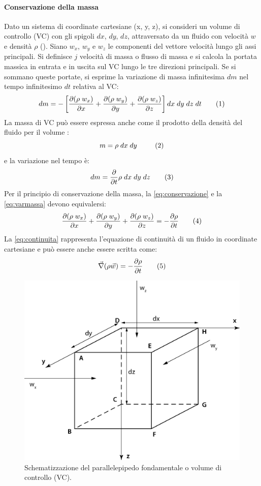 \paragraph{Conservazione della massa}
Dato un sistema di coordinate cartesiane (x, y, z), si consideri un volume di controllo (VC) con gli spigoli \(dx\), \(dy\), \(dz\), attraversato da un fluido con velocità \(w\) e densità \(\rho\) (). Siano \(w_x\), \(w_y\) e \(w_z\) le componenti del vettore velocità lungo gli assi principali. Si definisce \(j\) velocità di massa o flusso di massa e si calcola la portata massica in entrata e in uscita sul VC lungo le tre direzioni principali. Se si sommano queste portate, si esprime la variazione di massa infinitesima \(dm\) nel tempo infinitesimo \(dt\) relativa al VC:
\[dm= - \left[\dfrac{\partial(\rho \; w_x)}{\partial x} + \dfrac{\partial(\rho \; w_y)}{\partial y} + \dfrac{\partial(\rho \; w_z)}{\partial z} \right]dx \; dy \; dz \; dt \label{eq:conservazione} \addtag \]
La massa di VC può essere espressa anche come il prodotto della densità del fluido per il volume :
\[m= \rho \; dx \; dy \; \label{eq:massa}\ \addtag \]
e la variazione nel tempo è:
\[dm = \dfrac{\partial}{\partial t}\rho \; dx \; dy \; dz \label{eq:varmassa} \addtag \]
Per il principio di conservazione della massa, la \eqref{eq:conservazione} e la \eqref{eq:varmassa} devono equivalersi:
\[\dfrac{\partial(\rho \; w_x)}{\partial x} + \dfrac{\partial(\rho \; w_y)}{\partial y} + \dfrac{\partial(\rho \; w_z)}{\partial z}= - \dfrac{\partial \rho}{\partial t} \addtag \label{eq:continuita} \]
La \eqref{eq:continuita} rappresenta l'equazione di continuità di un fluido in coordinate cartesiane e può essere anche essere scritta come:
\[ \vec{\nabla} (\rho \vec{w}) = -\dfrac{\partial \rho}{\partial t} \addtag \label{eq:continuitadiff} \]

\begin{figure}[htbp] 
    \centering
    \includegraphics[width=.5\textwidth]{fig/fluidodinamica/cv.eps}
    \caption{Schematizzazione del parallelepipedo fondamentale o volume di controllo (VC).} 
    \label{fig:vc}
\end{figure}


